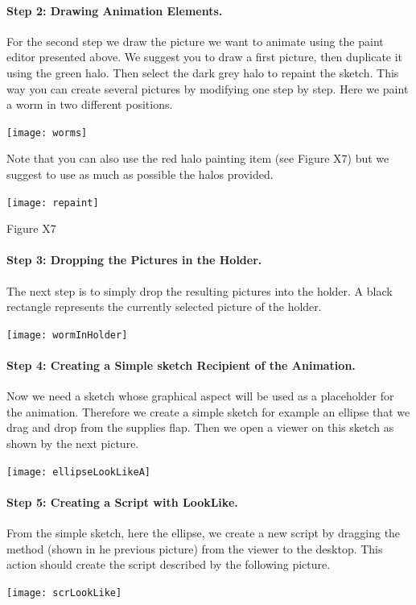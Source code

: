 \paragraph{Step 2: Drawing Animation Elements.} For the second step we draw the picture we want to animate using the paint editor presented above.  We suggest you to draw a first picture, then duplicate it using the green halo. Then select the dark grey halo to repaint the sketch. This way you can create several pictures by modifying one step by step. Here we paint a worm in two different positions. 
\begin{center}\texttt{[image: worms]}\end{center}


Note that you can also use the red halo painting item (see Figure X7) but we suggest to use as much as possible the halos provided. 
\begin{center}\texttt{[image: repaint]}\end{center}
Figure X7

\paragraph{Step 3: Dropping the Pictures in the Holder.}
The next step is to simply drop the resulting pictures into the holder. A black rectangle represents the currently selected picture
of the holder. 

\begin{center}\texttt{[image: wormInHolder]}\end{center}

\paragraph{Step 4: Creating a Simple sketch Recipient of  the Animation.}
Now we need a sketch whose graphical aspect will be used as a placeholder for the animation. Therefore  we create a simple sketch for example an ellipse that we drag and drop from 
the supplies flap. Then we open a viewer on this sketch as shown by the next picture.
\begin{center}\texttt{[image: ellipseLookLikeA]}\end{center}

\paragraph{Step 5: Creating a Script with LookLike.}
From the simple sketch, here the ellipse, we create a new script by dragging  the method   (shown in he previous picture)   from the viewer to the desktop. This action should create the script described by the following picture.
\begin{center}\texttt{[image: scrLookLike]}\end{center}

